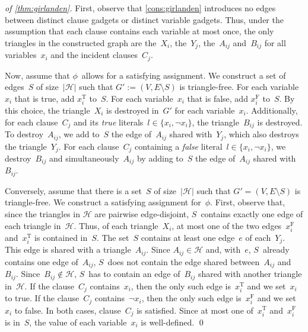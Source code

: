 \documentclass[envcountsame,numbook,smallextended]{svjour3}
\numberwithin{equation}{section}
\numberwithin{figure}{section}
\newcommand{\packing}{\ensuremath{\mathcal H}}
\begin{document}
\begin{proof}[of \cref{thm:girlanden}]
  First, observe that \cref{cons:girlanden} introduces no edges between distinct clause gadgets or distinct variable gadgets.  Thus, under the assumption that each clause contains each variable at most once, the only triangles in the constructed graph are the~$X_i$, the~$Y_j$, the~$A_{ij}$ and~$B_{ij}$ for all variables~$x_i$ and the incident clauses~$C_j$.


  Now, assume that $\phi$~allows for a satisfying assignment.  We construct a set of edges~$S$ of size~$|\packing|$ such that $G':=(V,E\setminus S)$ is triangle-free.  For each variable~$x_i$ that is true, add $x_i^\text{T}$ to~$S$.  For each variable~$x_i$ that is false, add $x_i^\text{F}$ to~$S$.  By this choice, the triangle~$X_i$ is destroyed in~$G'$ for each variable~$x_i$.  Additionally,
  for each clause~$C_j$ and its \emph{true} literals~$l\in\{x_i,\neg x_i\}$, the triangle~$B_{ij}$ is destroyed. To destroy~$A_{ij}$, we add to~$S$ the edge of~$A_{ij}$ shared with~$Y_j$, which also destroys the triangle~$Y_j$.
  For each clause~$C_j$ containing a \emph{false} literal~$l\in\{x_i,\neg x_i\}$, we destroy~$B_{ij}$ and simultaneously~$A_{ij}$ by adding to~$S$ the edge of~$A_{ij}$ shared with~$B_{ij}$.

  Conversely, assume that there is a set~$S$ of size~$|\packing|$ such that $G'=(V,E\setminus S)$ is triangle-free.  We construct a satisfying assignment for~$\phi$.
  First, observe that, since the triangles in $\packing$ are pairwise edge-disjoint, $S$~contains exactly one edge of each triangle in~$\packing$.  Thus, of each triangle~$X_i$, at most one of the two edges~$x_i^\text{F}$ and~$x_i^\text{T}$ is contained in~$S$.
  The set~$S$ contains at least one edge~$e$ of each~$Y_j$.  This edge is shared with a triangle~$A_{ij}$.  Since $A_{ij}\in\packing$ and, with~$e$, $S$~already contains one edge of~$A_{ij}$, $S$~does not contain the edge shared between~$A_{ij}$ and~$B_{ij}$.  Since~$B_{ij}\notin\packing$, $S$~has to contain an edge of~$B_{ij}$ shared with another triangle in~$\packing$.  If the clause~$C_j$ contains~$x_i$, then the only such edge is~$x_i^\text{T}$ and we set~$x_i$ to true.  If the clause~$C_j$ contains~$\neg x_i$, then the only such edge is~$x_i^\text{F}$ and we set~$x_i$ to false.  In both cases, clause~$C_j$ is satisfied.  Since at most one of~$x_i^\text{T}$ and~$x_i^\text{F}$ is in~$S$, the value of each variable~$x_i$ is well-defined.
\qed\end{proof}
\end{document}
